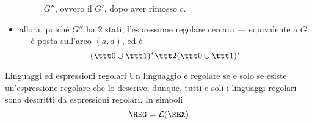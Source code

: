 \documentclass[a4paper, 12pt]{report}
\begin{document}
\begin{example}
\begin{itemize}
\begin{figure}[H]
                     \caption{$G''$, ovvero il \GNFA $G'$, dopo aver rimosso $c$.}
                \end{figure}

            \item allora, poiché $G''$ ha 2 stati, l'espressione regolare cercata --- equivalente a $G$ --- è posta sull'arco $(a,d)$, ed è $$(\ttt 0 \cup \ttt 1)^* \ttt 2 (\ttt 0 \cup \ttt 1)^*$$
        \end{itemize}
    \end{example}

    \begin{framedthm}[label={ling expr reg}]{Linguaggi ed espressioni regolari}
        Un linguaggio è regolare se e solo se esiste un'espressione regolare che lo descrive; dunque, tutti e soli i linguaggi regolari sono descritti da espressioni regolari. In simboli $$\mathrm{\REG} = \mathcal{L}(\REX)$$
    \end{framedthm}
\end{document}
